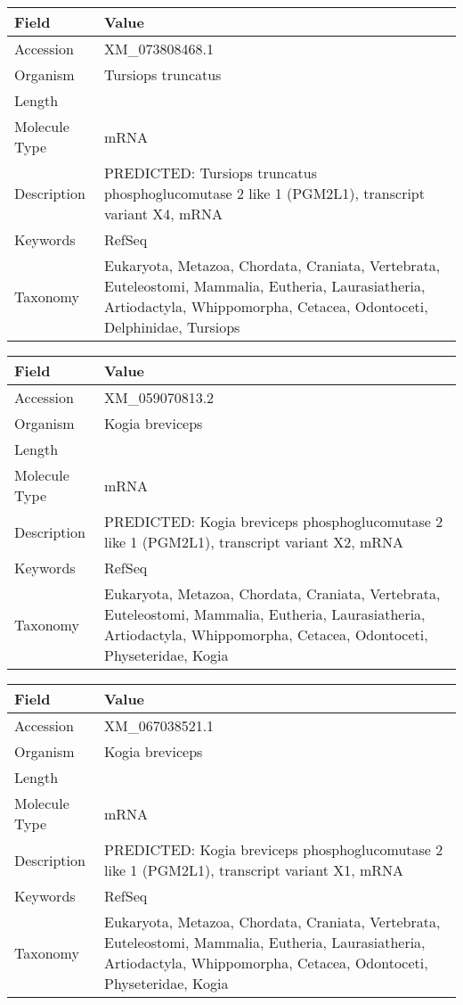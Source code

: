 \documentclass[10pt]{article}
\begin{document}
\vspace{1em}
{\footnotesize
\begin{longtable}{>{\raggedright\arraybackslash}p{4.5cm} >{\raggedright\arraybackslash}p{11.5cm}}
\textbf{Field} & \textbf{Value} \\
\hline
Accession & XM\_073808468.1 \\
Organism & Tursiops truncatus \\
Length & 3041 \\
Molecule Type & mRNA \\
Description & PREDICTED: Tursiops truncatus phosphoglucomutase 2 like 1 (PGM2L1), transcript variant X4, mRNA \\
Keywords & RefSeq \\
Taxonomy & Eukaryota, Metazoa, Chordata, Craniata, Vertebrata, Euteleostomi, Mammalia, Eutheria, Laurasiatheria, Artiodactyla, Whippomorpha, Cetacea, Odontoceti, Delphinidae, Tursiops \\
\end{longtable}
}

\vspace{1em}
{\footnotesize
\begin{longtable}{>{\raggedright\arraybackslash}p{4.5cm} >{\raggedright\arraybackslash}p{11.5cm}}
\textbf{Field} & \textbf{Value} \\
\hline
Accession & XM\_059070813.2 \\
Organism & Kogia breviceps \\
Length & 7235 \\
Molecule Type & mRNA \\
Description & PREDICTED: Kogia breviceps phosphoglucomutase 2 like 1 (PGM2L1), transcript variant X2, mRNA \\
Keywords & RefSeq \\
Taxonomy & Eukaryota, Metazoa, Chordata, Craniata, Vertebrata, Euteleostomi, Mammalia, Eutheria, Laurasiatheria, Artiodactyla, Whippomorpha, Cetacea, Odontoceti, Physeteridae, Kogia \\
\end{longtable}
}

\vspace{1em}
{\footnotesize
\begin{longtable}{>{\raggedright\arraybackslash}p{4.5cm} >{\raggedright\arraybackslash}p{11.5cm}}
\textbf{Field} & \textbf{Value} \\
\hline
Accession & XM\_067038521.1 \\
Organism & Kogia breviceps \\
Length & 6939 \\
Molecule Type & mRNA \\
Description & PREDICTED: Kogia breviceps phosphoglucomutase 2 like 1 (PGM2L1), transcript variant X1, mRNA \\
Keywords & RefSeq \\
Taxonomy & Eukaryota, Metazoa, Chordata, Craniata, Vertebrata, Euteleostomi, Mammalia, Eutheria, Laurasiatheria, Artiodactyla, Whippomorpha, Cetacea, Odontoceti, Physeteridae, Kogia \\
\end{longtable}
}
\end{document}
